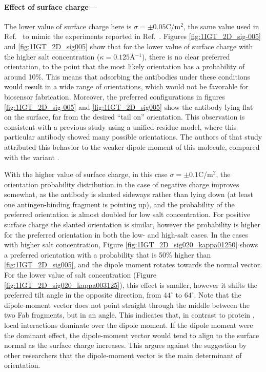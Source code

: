  \medskip
 
 \paragraph*{Effect of surface charge---}
 
The lower value of surface charge here is $\sigma=\pm 0.05$C/m$^2$, the same value used in Ref.~ to mimic the experiments reported in Ref.~. 
Figures \ref{fig:1IGT_2D_sig-005} and \ref{fig:1IGT_2D_sig005} show that for the lower value of surface charge with the higher salt concentration ($\kappa=0.125$\AA$^{-1}$), there is no clear preferred orientation, to the point that the most likely orientation has a probability of around 10\%. 
This means that adsorbing the antibodies under these conditions would result in a wide range of orientations, which would not be favorable for biosensor fabrication.
Moreover, the preferred configurations in figures \ref{fig:1IGT_2D_sig-005} and \ref{fig:1IGT_2D_sig005} show the antibody lying flat on the surface, far from the desired ``tail on'' orientation. 
This observation is consistent with a previous study using a unified-residue model,\cite{ZhouChenJiang2003} where this particular antibody showed many possible orientations. 
The authors of that study attributed this behavior to the weaker dipole moment of this molecule, compared with the variant .
 
With the higher value of surface charge, in this case $\sigma=\pm0.1$C/m$^2$, the orientation probability distribution in the case of negative charge improves somewhat, as the antibody is slanted sideways rather than lying down (at least one antingen-binding fragment is pointing up), and the probability of the preferred orientation is almost doubled for low salt concentration.
For positive surface charge the slanted orientation is similar, however the probability is higher for the preferred orientation in both the low- and high-salt cases.
In the cases with higher salt concentration, Figure \ref{fig:1IGT_2D_sig020_kappa01250} shows a preferred orientation with a probability that is 50\% higher than \ref{fig:1IGT_2D_sig005}, and the dipole moment rotates towards the normal vector. 
For the lower value of salt concentration (Figure \ref{fig:1IGT_2D_sig020_kappa003125}), this effect is smaller, however it shifts the preferred tilt angle in the opposite direction, from $44^{\circ}$ to $64^{\circ}$. Note that the dipole-moment vector does not point straight through the middle between the two Fab fragments, but in an angle.
This indicates that, in contrast to protein \gb, local interactions dominate over the dipole moment. If the dipole moment were the dominant effect, the dipole-moment vector would tend to align to the surface normal as the surface charge increases.
This argues against the suggestion by other researchers\cite{ChenLiuZhouJiang2003,ZhouChenJiang2003} that the dipole-moment vector is the main determinant of orientation.
 
